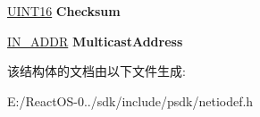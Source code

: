 \begin{DoxyCompactItemize}
\begin{tabbing}
\end{tabbing}\item 
\mbox{\label{struct___i_g_m_p___h_e_a_d_e_r_a860acbed9518426c3a62d880d2a8cde6}} 
\hyperlink{_processor_bind_8h_a09f1a1fb2293e33483cc8d44aefb1eb1}{U\+I\+N\+T16} {\bfseries Checksum}
\item 
\mbox{\label{struct___i_g_m_p___h_e_a_d_e_r_a5bff1b97200c1c26985e7d734c6d7173}} 
\hyperlink{structin__addr}{I\+N\+\_\+\+A\+D\+DR} {\bfseries Multicast\+Address}
\end{DoxyCompactItemize}


该结构体的文档由以下文件生成\+:\begin{DoxyCompactItemize}
\item 
E\+:/\+React\+O\+S-\/0../sdk/include/psdk/netiodef.\+h\end{DoxyCompactItemize}
